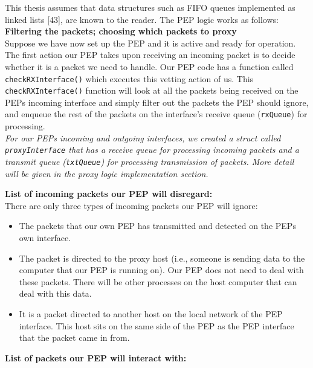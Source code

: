 \documentclass{uathesis}
\begin{document}
This thesis assumes that data structures such as FIFO queues implemented as linked lists [43], are known to the reader. The PEP logic works as follows: \\

\noindent \textbf{Filtering the packets; choosing which packets to proxy} \\
Suppose we have now set up the PEP and it is active and ready for operation. The first action our PEP takes upon receiving an incoming packet is to decide whether it is a packet we need to handle. Our PEP code has a function called {\tt checkRXInterface()} which executes this vetting action of us. This {\tt checkRXInterface()} function will look at all the packets being received on the PEPs incoming interface and simply filter out the packets the PEP should ignore, and enqueue the rest of the packets on the interface's receive queue ({\tt rxQueue}) for processing. \\ 

\emph{For our PEPs incoming and outgoing interfaces, we created a struct called {\tt proxyInterface} that has a receive queue for processing incoming packets and a transmit queue ({\tt txtQueue}) for processing transmission of packets.  More detail will be given in the proxy logic implementation section.} \\

\noindent \textbf{List of incoming packets our PEP will disregard:}\\
 
There are only three types of incoming packets our PEP will ignore:\\
\begin{itemize}
\item The packets that our own PEP has transmitted and detected on the PEPs  own interface.
\item The packet is directed to the proxy host (i.e., someone is sending data to the computer that our PEP is running on). Our PEP does not need to deal with these packets. There will be other processes on the host computer that can deal with this data.
\item It is a packet directed to another host on the local network of the PEP interface. This host sits on the same side of the PEP as the PEP interface that the packet came in from. \\
\end{itemize}

\noindent \textbf{List of packets our PEP will interact with:} \\
\end{document}
